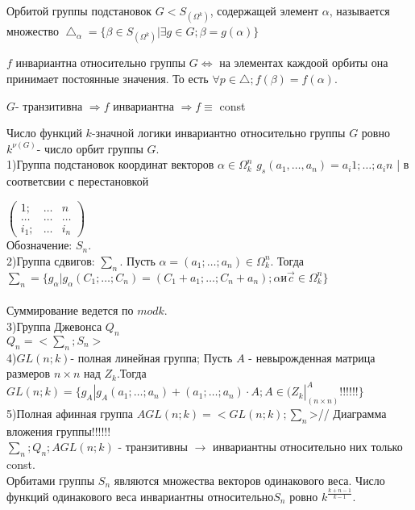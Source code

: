 \opr 
Орбитой группы подстановок $G<S_(\Omega^k)$, содержащей элемент $\alpha$, называется множество $\bigtriangleup_\alpha = \{ \beta \in S_(\Omega^k)|\exists g\in G;\beta =g(\alpha)\}$


\utv
$f$ инвариантна относительно группы $G \Leftrightarrow$ на элементах каждоой орбиты она принимает постоянные значения. То есть $\forall p \in \bigtriangleup; f(\beta) = f(\alpha)$.

\conseq
$G$- транзитивна $\Rightarrow f$ инвариантна $\Rightarrow f \equiv$ const

\conseq
Число функций $k$-значной логики инвариантно относительно группы $G$ ровно $k^{\nu(G)}$- число орбит группы $G$.\\

1)Группа подстановок координат векторов $\alpha \in \Omega_k^n $
$g_s(a_1, \dots , a_n)  =  a_i1;\dots ;a_in$ | в соответсвии с перестановкой 

$\begin{pmatrix}
  1;& \dots & n\\
  \dots & \dots & \dots\\
  i_1; & \dots & i_n
  
  
\end{pmatrix}$\\

Обозначение: $ S_n $.\\

2)Группа сдвигов: $ \sum_n $. Пусть $ \alpha = (a_1;\dots;a_n) \in \Omega_k^n $. Тогда $ \sum_n = \{g_\alpha|g_\alpha(C_1;\dots;C_n)=(C_1+a_1;\dots;C_n+a_n);\alpha и \vec{c} \in \Omega_k^n\} $ \\\\
Суммирование ведется по $mod k$.\\
3)Группа Джевонса $Q_n$\\
$Q_n = < \sum_n;S_n>$\\
4)$GL(n;k)$- полная линейная группа; Пусть $A$ - невырожденная матрица размеров $n \times n $ над $ Z_k$.Тогда $GL(n;k)=\{g_A|g_A(a_1;\dots;a_n)+(a_1;\dots;a_n)\cdotp A; A \in (Z_k|_(n \times n) ^A!!!!!!\}$
5)Полная афинная группа $AGL(n;k)=<GL(n;k);\sum_n$>//
Диаграмма вложения группы!!!!!!\\



$\sum_n;Q_n;AGL(n;k) $ - транзитивны $\rightarrow$ инвариантны относительно них только const.\\
Орбитами группы $S_n$ являются множества векторов одинакового веса. Число функций одинакового веса инвариантны относительно$ S_n$ ровно $k^\frac {k+n-1}{k-1}$.

